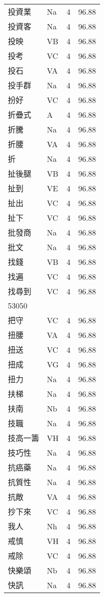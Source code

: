 \documentclass[twocolumn]{book}
\begin{document}
\begin{supertabular}{llrr}
投資業 & Na & 4 &  96.88\\
投資客 & Na & 4 &  96.88\\
投映 & VB & 4 &  96.88\\
投考 & VC & 4 &  96.88\\
投石 & VA & 4 &  96.88\\
投手群 & Na & 4 &  96.88\\
扮好 & VC & 4 &  96.88\\
折疊式 & A & 4 &  96.88\\
折騰 & Na & 4 &  96.88\\
折腰 & VA & 4 &  96.88\\
折 & Na & 4 &  96.88\\
扯後腿 & VB & 4 &  96.88\\
扯到 & VE & 4 &  96.88\\
扯出 & VC & 4 &  96.88\\
扯下 & VC & 4 &  96.88\\
批發商 & Na & 4 &  96.88\\
批文 & Na & 4 &  96.88\\
找錢 & VB & 4 &  96.88\\
找遍 & VC & 4 &  96.88\\
找尋到 & VC & 4 &  96.88\\
53050\\
把守 & VC & 4 &  96.88\\
扭腰 & VA & 4 &  96.88\\
扭送 & VC & 4 &  96.88\\
扭成 & VG & 4 &  96.88\\
扭力 & Na & 4 &  96.88\\
扶梯 & Na & 4 &  96.88\\
扶南 & Nb & 4 &  96.88\\
技職 & Na & 4 &  96.88\\
技高一籌 & VH & 4 &  96.88\\
技巧性 & Na & 4 &  96.88\\
抗癌藥 & Na & 4 &  96.88\\
抗質性 & Na & 4 &  96.88\\
抗敵 & VA & 4 &  96.88\\
抄下來 & VC & 4 &  96.88\\
我人 & Nh & 4 &  96.88\\
戒慎 & VH & 4 &  96.88\\
戒除 & VC & 4 &  96.88\\
快樂頌 & Nb & 4 &  96.88\\
快訊 & Na & 4 &  96.88\\

\end{supertabular}
\end{document}
